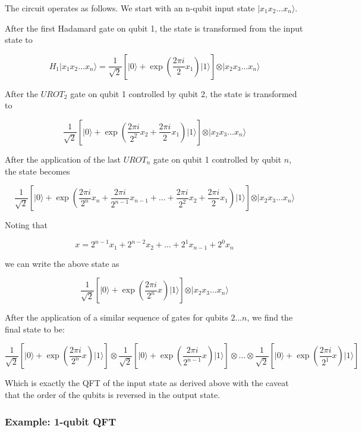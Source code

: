 \documentclass{article}
\begin{document}
The circuit operates as follows. We start with an n-qubit input state
\(\vert x_1x_2\ldots x_n\rangle\).

After the first Hadamard gate on qubit 1, the state is transformed from
the input state to

\[
H_1\vert x_1x_2\ldots x_n\rangle = 
\frac{1}{\sqrt{2}}
\left[\vert0\rangle + \exp\left(\frac{2\pi i}{2}x_1\right)\vert1\rangle\right]
\otimes
\vert x_2x_3\ldots x_n\rangle
\]

After the \(UROT_2\) gate on qubit 1 controlled by qubit 2, the state is
transformed to

\[
\frac{1}{\sqrt{2}}
\left[\vert0\rangle + \exp\left(\frac{2\pi i}{2^2}x_2 + \frac{2\pi i}{2}x_1\right)\vert1\rangle\right]
\otimes
\vert x_2x_3\ldots x_n\rangle
\]

After the application of the last \(UROT_n\) gate on qubit 1 controlled
by qubit \(n\), the state becomes

\[
\frac{1}{\sqrt{2}}
\left[\vert0\rangle + 
\exp\left(
\frac{2\pi i}{2^n}x_n + 
\frac{2\pi i}{2^{n-1}}x_{n-1} + 
\ldots + 
\frac{2\pi i}{2^2}x_2 + 
\frac{2\pi i}{2}x_1
\right)
\vert1\rangle\right]
\otimes
\vert x_2x_3\ldots x_n\rangle
\]

Noting that

\[
x = 2^{n-1}x_1 + 2^{n-2}x_2 + \ldots + 2^1x_{n-1} + 2^0x_n
\]

we can write the above state as

\[
\frac{1}{\sqrt{2}}
\left[\vert0\rangle + 
\exp\left(
\frac{2\pi i}{2^n}x 
\right)
\vert1\rangle\right]
\otimes
\vert x_2x_3\ldots x_n\rangle
\]

After the application of a similar sequence of gates for qubits
\(2\ldots n\), we find the final state to be:

\[
\frac{1}{\sqrt{2}}
\left[\vert0\rangle + 
\exp\left(
\frac{2\pi i}{2^n}x 
\right)
\vert1\rangle\right]
\otimes
\frac{1}{\sqrt{2}}
\left[\vert0\rangle + 
\exp\left(
\frac{2\pi i}{2^{n-1}}x 
\right)
\vert1\rangle\right]
\otimes
\ldots
\otimes
\frac{1}{\sqrt{2}}
\left[\vert0\rangle + 
\exp\left(
\frac{2\pi i}{2^{1}}x 
\right)
\vert1\rangle\right]
\]

Which is exactly the QFT of the input state as derived above with the
caveat that the order of the qubits is reversed in the output state.

\hypertarget{example-1-1-qubit-qft}{%
\subsubsection{\texorpdfstring{Example: 1-qubit QFT
}{}}\label{example-1-1-qubit-qft}}
\end{document}
